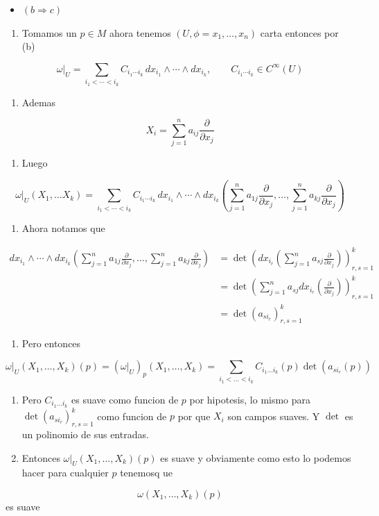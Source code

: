 \begin{bookproof}{}
\begin{itemize}
\item $(b\Rightarrow c)$
\end{itemize}
\begin{enumerate}
\item Tomamos un $p\in M$ ahora tenemos $(U,\phi=x_{1},\ldots,x_{n})$ carta entonces por (b)
\end{enumerate}
\[
\omega|_U=\sum_{i_1<\cdots<i_k}C_{i_1\cdots i_k}\,dx_{i_1}\wedge\cdots\wedge dx_{i_k},\qquad C_{i_1\cdots i_k}\in C^\infty(U)
\]
\begin{enumerate}[start=2]
\item Ademas
\end{enumerate}
\[
X_{i}=\sum^{n}_{j=1}a_{ij}\frac{\partial}{\partial x_{j}}
\]
\begin{enumerate}[start=3]
\item Luego
\end{enumerate}
\[
\omega|_{U}(X_{1},\ldots X_{k})=\sum_{i_1<\cdots<i_k}C_{i_1\cdots i_k}\,dx_{i_1}\wedge\cdots\wedge dx_{i_k}\left(\sum^{n}_{j=1}a_{1j}\frac{\partial}{\partial x_{j}},\ldots,\sum^{n}_{j=1}a_{kj}\frac{\partial}{\partial x_{j}}\right)
\]
\begin{enumerate}[start=4]
\item Ahora notamos que
\end{enumerate}
\[
\begin{aligned} dx_{i_1}\wedge\cdots\wedge dx_{i_k}\left(\sum^{n}_{j=1}a_{1j}\frac{\partial}{\partial x_{j}},\ldots,\sum^{n}_{j=1}a_{kj}\frac{\partial}{\partial x_{j}}\right)&=\det\left( dx_{i_{r}}\left( \sum^{n}_{j=1}a_{sj}\frac{\partial}{\partial x_{j}} \right) \right)_{r,s=1}^{k} \\ & =\det\left( \sum^{n}_{j=1} a_{sj}dx_{i_{r}}\left(\frac{\partial}{\partial x_{j}}\right) \right)_{r,s=1}^{k}\\&=\det(a_{s i_{r}})_{r,s=1}^{k} \end{aligned}
\]
\begin{enumerate}[start=5]
\item Pero entonces
\end{enumerate}
\[
\omega|_{U}(X_{1},\ldots,X_{k})(p)=(\omega|_{U})_{p}(X_{1},\ldots,X_{k})=\sum_{i_{1}<\ldots<i_{k}} C_{i_{1}\ldots i_{k}}(p)\det(a_{s i_{r}}(p))
\]
\begin{enumerate}[start=6]
\item Pero $C_{i_{1}\ldots i_{k}}$ es suave como funcion de $p$ por hipotesis, lo mismo para $\det(a_{s i_{r}})_{r,s=1}^{k}$ como funcion de $p$ por que $X_{i}$ son campos suaves. Y $\det$ es un polinomio de sus entradas.
\item Entonces $\omega|_{U}(X_{1},\ldots,X_{k})(p)$ es suave y obviamente como esto lo podemos hacer para cualquier $p$ tenemosq ue
\end{enumerate}
\[
\omega(X_{1},\ldots,X_{k})(p)
\]
es suave


\end{bookproof}
